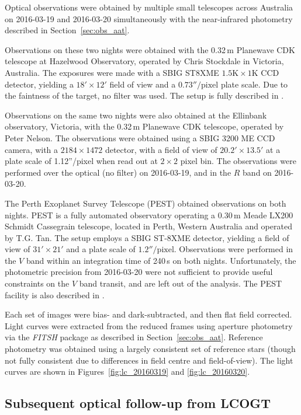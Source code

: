 \documentclass[apj]{emulateapj}
\begin{document}
Optical observations were obtained by multiple small telescopes across Australia on 2016-03-19 and 2016-03-20 simultaneously with the near-infrared photometry described in Section~\ref{sec:obs_aat}. 

Observations on these two nights were obtained with the 0.32\,m Planewave CDK telescope at Hazelwood Observatory, operated by Chris Stockdale in Victoria, Australia. The exposures were made with a SBIG ST8XME $1.5\mathrm{K}\times1 \mathrm{K}$ CCD detector, yielding a $18'\times12'$ field of view and a $0.73''/\mathrm{pixel}$ plate scale. Due to the faintness of the target, no filter was used. The setup is fully described in \citet{2015arXiv150908953R}.

Observations on the same two nights were also obtained at the Ellinbank observatory, Victoria, with the 0.32\,m Planewave CDK telescope, operated by Peter Nelson. The observations were obtained using a SBIG 3200 ME CCD camera, with a $2184\times1472$ detector, with a field of view of $20.2' \times 13.5'$ at a plate scale of 1.12''/pixel when read out at $2\times 2$ pixel bin. The observations were performed over the optical (no filter) on 2016-03-19, and in the $R$ band on 2016-03-20. 

The Perth Exoplanet Survey Telescope (PEST) obtained observations on both nights. PEST is a fully automated observatory operating a 0.30\,m Meade LX200 Schmidt Cassegrain telescope, located in Perth, Western Australia and operated by T.G. Tan. The setup employs a SBIG ST-8XME detector, yielding a field of view of $31'\times 21'$ and a plate scale of $1.2''/\mathrm{pixel}$. Observations were performed in the $V$ band within an integration time of 240\,s on both nights. Unfortunately, the photometric precision from 2016-03-20 were not sufficient to provide useful constraints on the $V$ band transit, and are left out of the analysis. The PEST facility is also described in \citet{2015arXiv150908953R}.

Each set of images were bias- and dark-subtracted, and then flat field corrected. Light curves were extracted from the reduced frames using aperture photometry via the \emph{FITSH} package as described in Section~\ref{sec:obs_aat}. Reference photometry was obtained using a largely consistent set of reference stars (though not fully consistent due to differences in field centre and field-of-view). The light curves are shown in Figures~\ref{fig:lc_20160319} and \ref{fig:lc_20160320}. 


\subsection{Subsequent optical follow-up from LCOGT}
\label{sec:lcogt}
\end{document}
